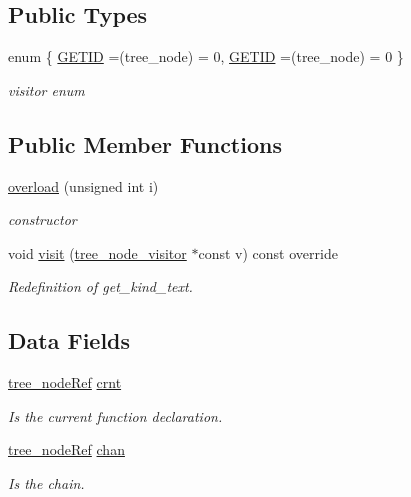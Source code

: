 \subsection*{Public Types}
\begin{DoxyCompactItemize}
\item 
enum \{ \hyperlink{structoverload_afce9f273a323f9fd962ddcf72f73ebfaa69dc515d3ba48e97f3581e32cd512f52}{G\+E\+T\+ID} =(tree\+\_\+node) = 0, 
\hyperlink{structoverload_afce9f273a323f9fd962ddcf72f73ebfaa69dc515d3ba48e97f3581e32cd512f52}{G\+E\+T\+ID} =(tree\+\_\+node) = 0
 \}\begin{DoxyCompactList}\small\item\em visitor enum \end{DoxyCompactList}
\end{DoxyCompactItemize}
\subsection*{Public Member Functions}
\begin{DoxyCompactItemize}
\item 
\hyperlink{structoverload_ad284e77aa7f5b91b5f8716a02cc31374}{overload} (unsigned int i)
\begin{DoxyCompactList}\small\item\em constructor \end{DoxyCompactList}\item 
void \hyperlink{structoverload_af5069d7e549fbd84ae60f60b8efaf225}{visit} (\hyperlink{classtree__node__visitor}{tree\+\_\+node\+\_\+visitor} $\ast$const v) const override
\begin{DoxyCompactList}\small\item\em Redefinition of get\+\_\+kind\+\_\+text. \end{DoxyCompactList}\end{DoxyCompactItemize}
\subsection*{Data Fields}
\begin{DoxyCompactItemize}
\item 
\hyperlink{tree__node_8hpp_a6ee377554d1c4871ad66a337eaa67fd5}{tree\+\_\+node\+Ref} \hyperlink{structoverload_a49527c46fdcda381f476c6ffc84b8385}{crnt}
\begin{DoxyCompactList}\small\item\em Is the current function declaration. \end{DoxyCompactList}\item 
\hyperlink{tree__node_8hpp_a6ee377554d1c4871ad66a337eaa67fd5}{tree\+\_\+node\+Ref} \hyperlink{structoverload_a877c1bc09e35824204573c3f0bf4d80b}{chan}
\begin{DoxyCompactList}\small\item\em Is the chain. \end{DoxyCompactList}\end{DoxyCompactItemize}
